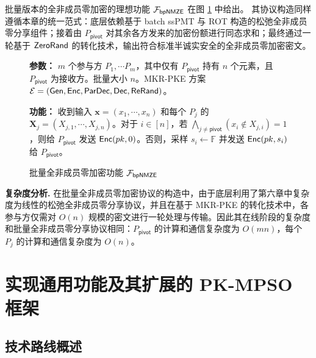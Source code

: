 批量版本的全非成员零加密的理想功能 $\mathcal{F}_\mathsf{bpNMZE}$ 在图 \ref{fig:func-bpnmze} 中给出。
其协议构造同样遵循本章的统一范式：底层依赖基于 batch ssPMT 与 ROT 构造的松弛全非成员零分享组件；接着由 $P_\mathsf{pivot}$ 对其余各方发来的加密份额进行同态求和；最终通过一轮基于 $\mathsf{ZeroRand}$ 的转化技术，输出符合标准半诚实安全的全非成员零加密密文。

\begin{figure}[!htb]
\begin{framed}
\begin{minipage}[c]{\textwidth}
\begin{trivlist}
\item \textbf{参数：} $m$ 个参与方 $P_1, \cdots P_m$，其中仅有 $P_\mathsf{pivot}$ 持有 $n$ 个元素，且 $P_\mathsf{pivot}$ 为接收方。批量大小 $n$。MKR-PKE 方案 $\mathcal{E} = (\mathsf{Gen}, \mathsf{Enc}, \mathsf{ParDec}, \mathsf{Dec}, \mathsf{ReRand})$。
\item \textbf{功能：} 收到输入 $\textbf{x} = (x_1, \cdots, x_n)$ 和每个 $P_j$ 的 $\textbf{X}_j = (X_{j,1}, \cdots, X_{j,n})$。对于 $i \in [n]$，若 $\bigwedge_{j \neq \mathsf{pivot}} (x_i \notin X_{j,i}) = 1$，则给 $P_\mathsf{pivot}$ 发送 $\mathsf{Enc}(pk,0)$。否则，采样 $s_i \gets \mathbb{F}$ 并发送 $\mathsf{Enc}(pk,s_i)$ 给 $P_\mathsf{pivot}$。
\end{trivlist}
\end{minipage}
\end{framed}
\caption{批量全非成员零加密功能 $\mathcal{F}_\mathsf{bpNMZE}$}\label{fig:func-bpnmze}
\end{figure}

\begin{trivlist}
\item \textbf{复杂度分析.} 在批量全非成员零加密协议的构造中，由于底层利用了第六章中复杂度为线性的松弛全非成员零分享协议，并且在基于 MKR-PKE 的转化技术中，各参与方仅需对 $O(n)$ 规模的密文进行一轮处理与传输。因此其在线阶段的复杂度和批量全非成员零分享协议相同：$P_\mathsf{pivot}$ 的计算和通信复杂度为 $O(mn)$，每个 $P_j$ 的计算和通信复杂度为 $O(n)$。 
\end{trivlist}

\section{实现通用功能及其扩展的 PK-MPSO 框架}

\subsection{技术路线概述}

